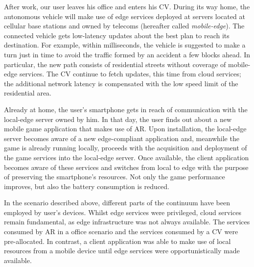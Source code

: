 After work, our user leaves his office and enters his CV. During its way home, the autonomous vehicle will make use of edge services deployed at servers located at cellular base stations and owned by telecoms (hereafter called \textit{mobile-edge}). The connected vehicle gets low-latency updates about the best plan to reach its destination. For example, within milliseconds, the vehicle is suggested to make a turn just in time to avoid the traffic formed by an accident a few blocks ahead. In particular, the new path consists of residential streets without coverage of mobile-edge services. The CV continue to fetch updates, this time from cloud services; the additional network latency is compensated with the low speed limit of the residential area.

Already at home, the user's smartphone gets in reach of communication with the local-edge server owned by him. In that day, the user finds out about a new mobile game application that makes use of AR. Upon installation, the local-edge server becomes aware of a new edge-compliant application and, meanwhile the game is already running locally, proceeds with the acquisition and deployment of the game services into the local-edge server. Once available, the client application becomes aware of these services and switches from local to edge with the purpose of preserving the smartphone's resources. Not only the game performance improves, but also the battery consumption is reduced.  

In the scenario described above, different parts of the continuum have been employed by user's devices. Whilst edge services were privileged, cloud services remain fundamental, as edge infrastructure was not always available. The services consumed by AR in a office scenario and the services consumed by a CV were pre-allocated. In contrast, a client application was able to make use of local resources from a mobile device until edge services were opportunistically made available. 

